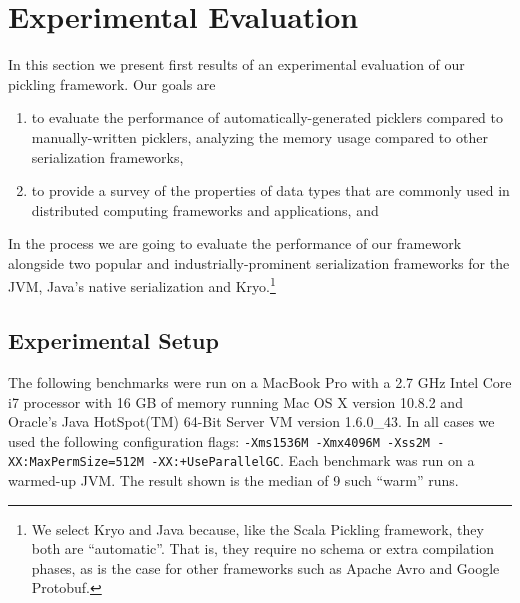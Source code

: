 \documentclass[preprint,10pt]{sigplanconf}
\theoremstyle{definition}
\theoremstyle{definition}
\newcommand{\todo}{{\bf \colorbox{red}{\color{white}TODO:}}}
\begin{document}




\section{Experimental Evaluation}
\label{sec:evaluation}

In this section we present first results of an experimental evaluation
of our pickling framework. Our goals are
\begin{enumerate}
\item to evaluate the performance of automatically-generated picklers
  compared to manually-written picklers, analyzing the memory usage
  compared to other serialization frameworks,
\item to provide a survey of the properties of data types that are
  commonly used in distributed computing frameworks and applications,
  and
\end{enumerate}\noindent
In the process we are going to evaluate the performance of our
framework alongside two popular and industrially-prominent serialization frameworks
for the JVM, Java's native serialization and Kryo.\footnote{We select Kryo and Java because, like the Scala Pickling framework, they both are ``automatic''. That is, they require no schema or extra compilation phases, as is the case for other frameworks such as Apache Avro and Google Protobuf.}

\subsection{Experimental Setup}

The following benchmarks were run on a MacBook Pro with a 2.7 GHz
Intel Core i7 processor with 16 GB of memory running Mac OS X version
10.8.2 and Oracle's Java HotSpot(TM) 64-Bit Server VM version
1.6.0\_43. In all cases we used the following configuration flags:
\texttt{-Xms1536M -Xmx4096M -Xss2M -XX:MaxPermSize=512M -XX:+UseParallelGC}. Each benchmark was run on a warmed-up JVM. The result shown is the median of 9 such ``warm'' runs.
\end{document}
